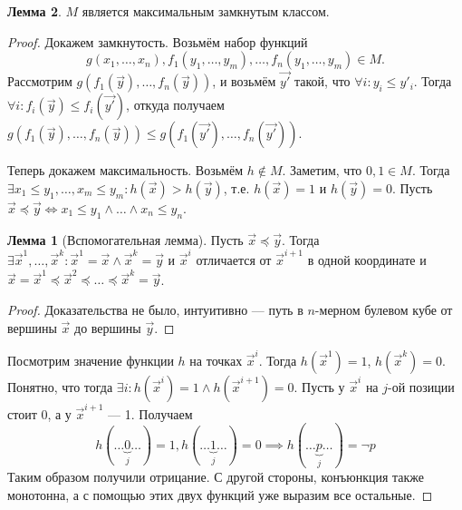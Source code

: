 \documentclass[12pt]{article}
\let\la\land
\let\n\neg
\let\nin\notin
\theoremstyle{definition}
\theoremstyle{statement}
\theoremstyle{theorem}
\newtheorem{lemma}{Лемма}[section]
\begin{document}
\begin{lemma}
  $M$ является максимальным замкнутым классом.

  \begin{proof}
    Докажем замкнутость. Возьмём набор функций
    \begin{displaymath}
      g(x_1, \dots, x_n), f_1(y_1, \dots, y_m), \dots, f_n(y_1,
      \dots, y_m) \in M.
    \end{displaymath}
    Рассмотрим $g(f_1(\vec{y}), \dots, f_n(\vec{y}))$, и возьмём
    $\vec{y'}$ такой, что $\forall i \colon y_i \leqslant y'_i$.
    Тогда $\forall i \colon f_i(\vec{y}) \leqslant f_i(\vec{y'})$,
    откуда получаем $g(f_1(\vec{y}), \dots, f_n(\vec{y})) \leqslant
    g(f_1(\vec{y'}), \dots, f_n(\vec{y'}))$.

    Теперь докажем максимальность. Возьмём $h \nin M$. Заметим, что
    $0, 1 \in M$. Тогда $\exists x_1 \leqslant y_1, \dots, x_m
    \leqslant y_m \colon h(\vec{x}) > h(\vec{y})$, т.е. $h(\vec{x}) =
    1$ и $h(\vec{y}) = 0$. Пусть $\vec{x} \preccurlyeq
    \vec{y} \iff x_1 \leqslant y_1 \la \dots \la x_n \leqslant y_n$.

    \begin{lemma}[Вспомогательная лемма]
      Пусть $\vec{x} \preccurlyeq \vec{y}$. Тогда $\exists \vec{x}^1,
      \dots, \vec{x}^k \colon \vec{x}^1 = \vec{x} \la \vec{x}^k =
      \vec{y}$ и $\vec{x}^i$ отличается от $\vec{x}^{i+1}$ в одной
      координате и $\vec{x} = \vec{x}^1 \preccurlyeq \vec{x}^2
      \preccurlyeq \dots \preccurlyeq \vec{x}^k = \vec{y}$.
      \begin{proof}
        Доказательства не было, интуитивно --- путь в $n$-мерном
        булевом кубе от вершины $\vec{x}$ до вершины $\vec{y}$.
      \end{proof}
    \end{lemma}
    Посмотрим значение функции $h$ на точках $\vec{x}^i$. Тогда
    $h(\vec{x}^1) = 1$, $h(\vec{x}^k) = 0$. Понятно, что тогда
    $\exists i \colon h(\vec{x}^i) = 1 \la h(\vec{x}^{i+1}) = 0$.
    Пусть у $\vec{x}^i$ на $j$-ой позиции стоит 0, а у
    $\vec{x}^{i+1}$ --- 1. Получаем
    \[
      h(\dots \underbrace{0}_j \dots) = 1, h(\dots \underbrace{1}_j
      \dots) = 0 \implies h(\dots \underbrace{p}_j \dots) = \n p
    \]
    Таким образом получили отрицание. С другой стороны, конъюнкция
    также монотонна, а с помощью этих двух функций уже выразим все остальные.
  \end{proof}
\end{lemma}
\end{document}
